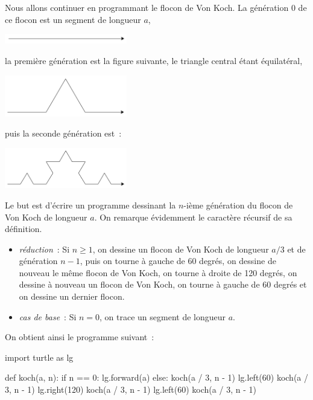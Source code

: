 \documentclass{magnoliaold}
\begin{document}
Nous allons continuer en programmant le flocon de Von Koch. La génération 0
de ce flocon est un segment de longueur $a$,
\begin{center}
\includegraphics[width=0.4\textwidth]{../../commun/images/python-cours-koch-0}
\end{center}
la première génération est la figure suivante, le \og triangle \fg central étant
équilatéral,
\begin{center}
\includegraphics[width=0.4\textwidth]{../../commun/images/python-cours-koch-1}
\end{center}
puis la seconde génération est~:
\begin{center}
\includegraphics[width=0.4\textwidth]{../../commun/images/python-cours-koch-2}
\end{center}
Le but est d'écrire un programme dessinant la $n$-ième génération du flocon de
Von Koch de longueur $a$. On remarque évidemment le caractère récursif de sa
définition.
\begin{itemize}
\item \emph{réduction}~: Si $n\geq 1$, on dessine un flocon de Von Koch de longueur
  $a/3$ et de génération $n-1$, puis on tourne à gauche de 60 degrés, on
  dessine de nouveau le même flocon de Von Koch, on tourne à droite de 120 degrés,
  on dessine à nouveau un flocon de Von Koch, on tourne à gauche de 60 degrés
  et on dessine un dernier flocon.
\item \emph{cas de base}~: Si $n=0$, on trace un segment de longueur $a$.
\end{itemize}
On obtient ainsi le programme suivant~:
\begin{pythoncodeline}
import turtle as lg

def koch(a, n):
    if n == 0:
        lg.forward(a)
    else:
        koch(a / 3, n - 1)
        lg.left(60)
        koch(a / 3, n - 1)
        lg.right(120)
        koch(a / 3, n - 1)
        lg.left(60)
        koch(a / 3, n - 1)
\end{pythoncodeline}
\end{document}
